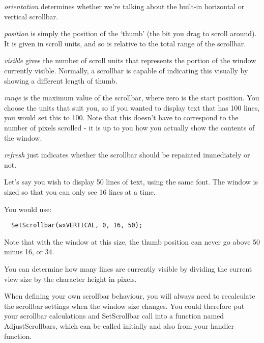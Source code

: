 {\it orientation} determines whether we're talking about
the built-in horizontal or vertical scrollbar.

{\it position} is simply the position of the `thumb' (the bit you drag to scroll around).
It is given in scroll units, and so is relative to the total range of the scrollbar.

{\it visible} gives the number of scroll units that represents the portion of the
window currently visible. Normally, a scrollbar is capable of indicating this visually
by showing a different length of thumb.

{\it range} is the maximum value of the scrollbar, where zero is the start
position. You choose the units that suit you,
so if you wanted to display text that has 100 lines, you would set this to 100.
Note that this doesn't have to correspond to the number of pixels scrolled - it is
up to you how you actually show the contents of the window.

{\it refresh} just indicates whether the scrollbar should be repainted immediately or not.


Let's say you wish to display 50 lines of text, using the same font.
The window is sized so that you can only see 16 lines at a time.

You would use:

{\small%
\begin{verbatim}
  SetScrollbar(wxVERTICAL, 0, 16, 50);
\end{verbatim}
}

Note that with the window at this size, the thumb position can never go
above 50 minus 16, or 34.

You can determine how many lines are currently visible by dividing the current view
size by the character height in pixels.

When defining your own scrollbar behaviour, you will always need to recalculate
the scrollbar settings when the window size changes. You could therefore put your
scrollbar calculations and SetScrollbar
call into a function named AdjustScrollbars, which can be called initially and also
from your  handler function.



